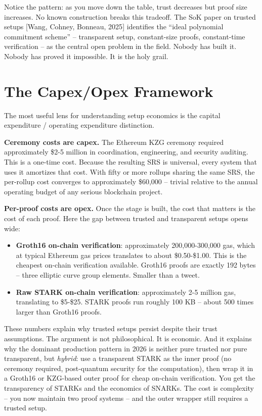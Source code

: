 \documentclass[
  11pt,
  openany]{report}
\providecommand{\tightlist}{%
  \setlength{\itemsep}{0pt}\setlength{\parskip}{0pt}}
\renewcommand{\textbf}[1]{{\bfseries\color{MidnightBold}#1}}
\begin{document}
Notice the pattern: as you move down the table, trust decreases but proof size
increases. No known construction breaks this tradeoff. The SoK paper on trusted
setups {[}Wang, Cohney, Bonneau, 2025{]} identifies the ``ideal polynomial
commitment scheme'' -- transparent setup, constant-size proofs, constant-time
verification -- as the central open problem in the field. Nobody has built it.
Nobody has proved it impossible. It is the holy grail.

\section{The Capex/Opex Framework}\label{the-capexopex-framework}

The most useful lens for understanding setup economics is the capital
expenditure / operating expenditure distinction.

\textbf{Ceremony costs are capex.} The Ethereum KZG ceremony required
approximately \$2-5 million in coordination, engineering, and security auditing.
This is a one-time cost. Because the resulting SRS is universal, every system
that uses it amortizes that cost. With fifty or more rollups sharing the same
SRS, the per-rollup cost converges to approximately \$60,000 -- trivial relative
to the annual operating budget of any serious blockchain project.

\textbf{Per-proof costs are opex.} Once the stage is built, the cost that
matters is the cost of each proof. Here the gap between trusted and transparent
setups opens wide:

\begin{itemize}
\tightlist
\item
  \textbf{Groth16 on-chain verification}: approximately 200,000-300,000 gas,
  which at typical Ethereum gas prices translates to about \$0.50-\$1.00. This
  is the cheapest on-chain verification available. Groth16 proofs are exactly
  192 bytes -- three elliptic curve group elements. Smaller than a tweet.
\item
  \textbf{Raw STARK on-chain verification}: approximately 2-5 million gas,
  translating to \$5-\$25. STARK proofs run roughly 100 KB -- about 500 times
  larger than Groth16 proofs.
\end{itemize}

These numbers explain why trusted setups persist despite their trust
assumptions. The argument is not philosophical. It is economic. And it explains
why the dominant production pattern in 2026 is neither pure trusted nor pure
transparent, but \emph{hybrid}: use a transparent STARK as the inner proof (no
ceremony required, post-quantum security for the computation), then wrap it in a
Groth16 or KZG-based outer proof for cheap on-chain verification. You get the
transparency of STARKs and the economics of SNARKs. The cost is complexity --
you now maintain two proof systems -- and the outer wrapper still requires a
trusted setup.
\end{document}

